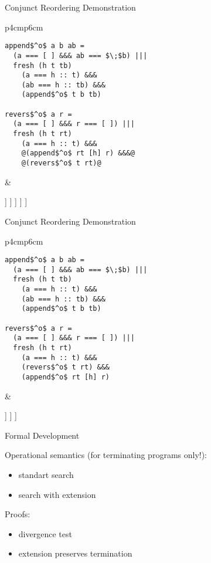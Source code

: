 \documentclass{beamer}
\theoremstyle{definition}
\theoremstyle{plain} %
\begin{document}
\begin{frame}[fragile]{Conjunct Reordering Demonstration}
  \begin{tabular}{p{4cm}p{6cm}}
    \begin{lstlisting}
append$^o$ a b ab =		
  (a === [ ] &&& ab === $\;$b) |||
  fresh (h t tb) 
    (a === h :: t) &&&
    (ab === h :: tb) &&&
    (append$^o$ t b tb) 
  
revers$^o$ a r =	
  (a === [ ] &&& r === [ ]) |||
  fresh (h t rt) 
    (a === h :: t) &&&
    @(append$^o$ rt [h] r) &&&@
    @(revers$^o$ t rt)@
\end{lstlisting}
&
\begin{center}
 \Tree [.{\lstinline|revers$^o\; [1,\,2,\,3]\; r$|}
    [.{$[1,\,2,\,3]\not\equiv [\;]$} ]
    [.{$[1,\,2,\,3]\equiv h_0::t_0$}
      [.{\lstinline|append$^o\;rt_0\;[1]\;r$|}
        [.{$\dots$} ]
        [.{$rt_0\equiv h_1::t_1$} [.{$r\equiv h_1::tb_0$} [.{\lstinline|append$^o\;t_1\;[1]\;tb_0$|} ] ] ]
      ]
    ]
  ]
\end{center}
\end{tabular}
\end{frame}

\begin{frame}[fragile]{Conjunct Reordering Demonstration}
  \begin{tabular}{p{4cm}p{6cm}}
    \begin{lstlisting}
append$^o$ a b ab =		
  (a === [ ] &&& ab === $\;$b) |||
  fresh (h t tb) 
    (a === h :: t) &&&
    (ab === h :: tb) &&&
    (append$^o$ t b tb) 
  
revers$^o$ a r =	
  (a === [ ] &&& r === [ ]) |||
  fresh (h t rt) 
    (a === h :: t) &&&
    (revers$^o$ t rt) &&&
    (append$^o$ rt [h] r)
\end{lstlisting}
&
\begin{center}
 \Tree [.{\lstinline|revers$^o\; [1,\,2,\,3]\; r$|}
    [.{$[1,\,2,\,3]\not\equiv [\;]$} ]
    [.{$[1,\,2,\,3]\equiv h_0::t_0$}
      [.{\lstinline|revers$^o\;[2,\,3]\;rt_0$|}
        [.{$\dots$} ]
      ]
    ]
  ]
\end{center}
\end{tabular}
\end{frame}

\begin{frame}{Formal Development}

Operational semantics (for terminating programs only!):
 \begin{itemize}
 \item standart search
 \item search with extension
 \end{itemize}
 
 \vskip1cm
 
 Proofs:
 \begin{itemize}
 \item divergence test
 \item extension preserves termination
 \end{itemize}
 
\end{frame}
\end{document}
